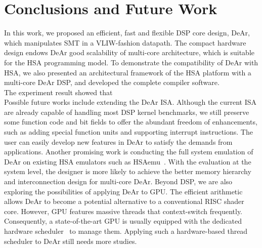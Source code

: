 \chapter{Conclusions and Future Work}
In this work, we proposed an efficient, fast and flexible DSP core design, DeAr,
which manipulates SMT in a VLIW-fashion datapath.
The compact hardware design endows DeAr good scalability of multi-core architecture, 
which is suitable for the HSA programming model.
To demonstrate the compatibility of DeAr with HSA,
we also presented an architectural framework of the HSA platform with a multi-core DeAr DSP, 
and developed the complete compiler software.
\\\indent
The experiment result showed that
\\\indent
Possible future works include extending the DeAr ISA.
Although the current ISA are already capable of handling most DSP kernel benchmarks, 
we still preserve some function code and bit fields to offer the abundant freedom of enhancements, 
such as adding special function units and supporting interrupt instructions.
The user can easily develop new features in DeAr to satisfy the demands from applications.
Another promising work is conducting the full system emulation of DeAr on existing HSA emulators such as HSAemu~\cite{hsaemu}.
With the evaluation at the system level, the designer is more likely to achieve the better memory hierarchy and interconnection design for multi-core DeAr.
Beyond DSP, we are also exploring the possibilities of applying DeAr to GPU.
The efficient arithmetic allows DeAr to become a potential alternative to a conventional RISC shader core.
However, GPU features massive threads that context-switch frequently.
Consequently, a state-of-the-art GPU is usually equipped with the dedicated hardware scheduler~\cite{fermi} to manage them.
Applying such a hardware-based thread scheduler to DeAr still needs more studies.


